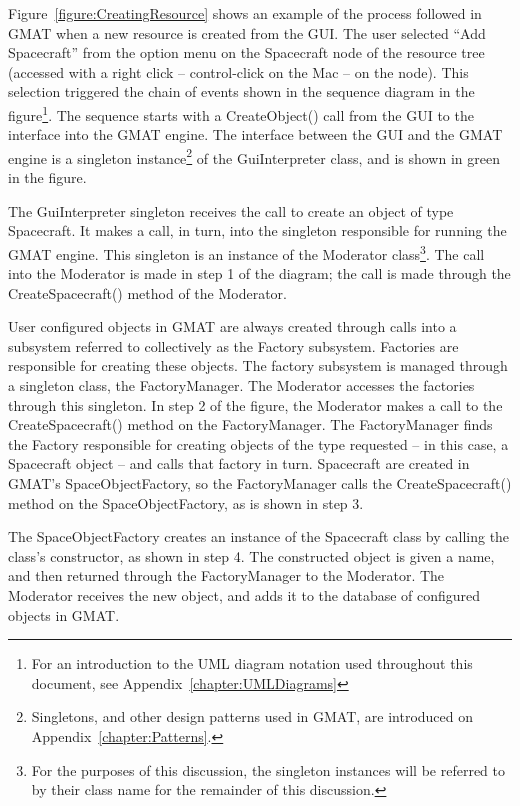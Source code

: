 Figure~\ref{figure:CreatingResource} shows an example of the process followed in GMAT when a new
resource is created from the GUI.  The user selected ``Add Spacecraft'' from the option menu on the
Spacecraft node of the resource tree (accessed with a right click -- control-click on the Mac -- on
the node).  This selection triggered the chain of events shown in the sequence diagram in the
figure\footnote{For an introduction to the UML diagram notation used throughout this document, see
Appendix~\ref{chapter:UMLDiagrams}}.  The sequence starts with a CreateObject() call from the GUI to
the interface into the GMAT engine.  The interface between the GUI and the GMAT engine is a
singleton instance\footnote{Singletons, and other design patterns used in GMAT, are introduced on
Appendix~\ref{chapter:Patterns}.} of the GuiInterpreter class, and is shown in green in the figure.

The GuiInterpreter singleton receives the call to create an object of type Spacecraft.  It makes a
call, in turn, into the singleton responsible for running the GMAT engine.  This singleton is an
instance of the Moderator class\footnote{For the purposes of this discussion, the singleton
instances will be referred to by their class name for the remainder of this discussion.}.  The call
into the Moderator is made in step 1 of the diagram; the call is made through the CreateSpacecraft()
method of the Moderator.

User configured objects in GMAT are always created through calls into a subsystem referred to
collectively as the Factory subsystem.  Factories are responsible for creating these objects.  The
factory subsystem is managed through a singleton class, the FactoryManager.  The Moderator accesses
the factories through this singleton.  In step 2 of the figure, the Moderator makes a call to the
CreateSpacecraft() method on the FactoryManager.  The FactoryManager finds the Factory responsible
for creating objects of the type requested -- in this case, a Spacecraft object -- and calls that
factory in turn.  Spacecraft are created in GMAT's SpaceObjectFactory, so the FactoryManager calls
the CreateSpacecraft() method on the SpaceObjectFactory, as is shown in step 3.

The SpaceObjectFactory creates an instance of the Spacecraft class by calling the class's
constructor, as shown in step 4.  The constructed object is given a name, and then returned
through the FactoryManager to the Moderator.  The Moderator receives the new object, and adds it to
the database of configured objects in GMAT.

